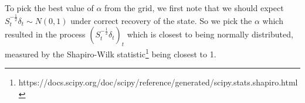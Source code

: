 To pick the best value of $\alpha$ from the grid, we first note that we should expect $S_t^{-\frac{1}{2}}\delta_t \sim N(0,1)$  under correct recovery of the state. So we pick the $\alpha$ which resulted in the process $(S_t^{-\frac{1}{2}}\delta_t)_t$ which is closest to being normally distributed, measured by the Shapiro-Wilk statistic\footnote[1]{https://docs.scipy.org/doc/scipy/reference/generated/scipy.stats.shapiro.html} being closest to 1.

